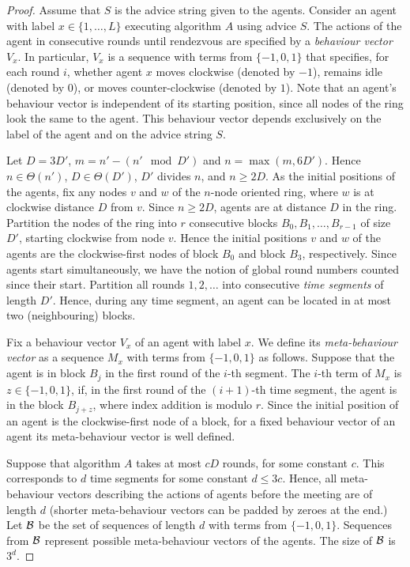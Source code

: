 \documentclass{llncs}
\begin{document}
\begin{proof}
Assume that $S$ is the advice string given to the agents. Consider an agent with 
label $x \in \{1,\ldots,L\}$ executing algorithm $A$ using advice $S$. The actions of the agent in consecutive rounds until rendezvous are specified by  
a \emph{behaviour vector} $V_x$. In particular, $V_x$ is a sequence with terms from $\{-1,0,1\}$ that specifies, for each round $i$, whether agent  $x$ moves clockwise (denoted by $-1$), remains idle (denoted by $0$), or moves counter-clockwise (denoted by $1$). Note that an agent's behaviour vector is independent of its starting position, since all nodes of the ring look the same to the agent.  This behaviour vector depends exclusively on the label of the agent and on the advice string $S$.

Let $D=3D'$, $m=n'-(n'\mod D')$ and $n=\max(m, 6D')$. Hence $n \in \Theta(n')$, $D \in \Theta(D')$, $D'$ divides $n$, and $n\geq 2D$. 
As the initial positions of the agents,
fix any nodes $v$ and $w$ of the $n$-node oriented ring, where $w$ is at clockwise distance $D$ from $v$. Since $n\geq 2D$,
agents are at distance $D$ in the ring. 
Partition the nodes of the ring into $r$ consecutive blocks $B_0,B_1,\dots, B_{r-1}$ of size $D'$, starting clockwise from node $v$.
Hence the initial positions $v$ and $w$ of the agents are the clockwise-first nodes of block $B_0$ and block $B_3$, respectively.
Since agents start simultaneously, we have the notion of global round numbers counted since their start.
Partition all rounds $1,2,\dots$ into consecutive {\em time segments} of length $D'$. Hence, during any time segment, an agent can be
located in at most two (neighbouring) blocks.

Fix a behaviour vector $V_x$ of an agent with label $x$.
We define its {\em meta-behaviour vector} as a sequence  $M_x$ with terms from $\{-1,0,1\}$ as follows. 
Suppose that the agent is in block $B_j$ in the first round of the $i$-th segment.
The $i$-th term of $M_x$ is $z \in \{-1,0,1\}$, if, in the first round of the $(i+1)$-th time segment, the agent is in the block $B_{j+z}$, where index addition is modulo $r$. 
Since the initial position of an agent  is the clockwise-first node of a block, for a fixed behaviour vector of an agent its meta-behaviour vector is well defined.

Suppose that algorithm $A$ takes at most $cD$ rounds, for some constant $c$. This corresponds to $d$ time segments for some constant $d\leq 3c$. Hence,
all meta-behaviour vectors describing the actions of agents before the meeting are of length $d$ (shorter meta-behaviour vectors can be padded by zeroes at the end.) Let $\cal B$ be the set of sequences of length $d$ with 
terms from $\{-1,0,1\}$. Sequences from $\cal B$ represent possible meta-behaviour vectors of the agents. The size of $\cal B$ is $3^d$. 


\end{proof}
\end{document}
